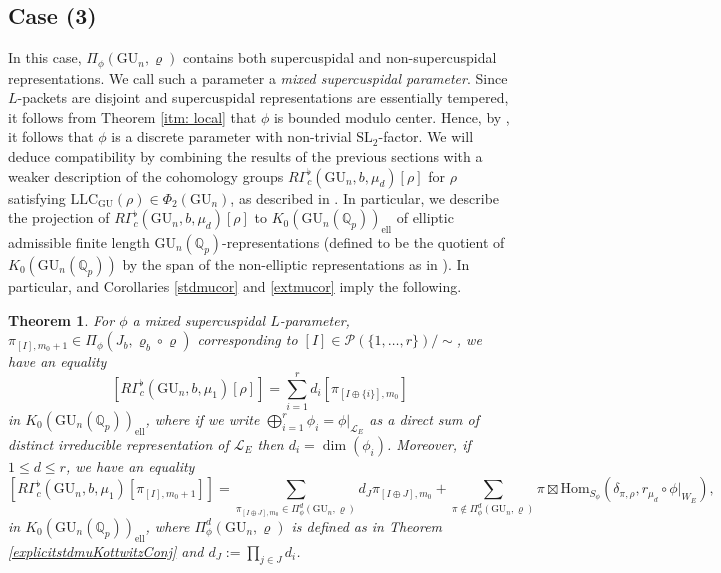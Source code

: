 \documentclass[reqno,11pt]{amsart}
\newtheorem{theorem}{Theorem}[section]
\theoremstyle{remark}
\newcommand{\GU}{\mathrm{GU}}
\newcommand{\mc}{\mathcal}
\newcommand{\Q}{\mathbb{Q}}
\newcommand{\SL}{\mathrm{SL}}
\newcommand{\LLC}{\mathrm{LLC}}
\begin{document}
\subsection{Case (3)} In this case, $\Pi_{\phi}(\GU_n, \varrho)$ contains both supercuspidal and non-supercuspidal representations. We call such a parameter a \emph{mixed supercuspidal parameter}. Since $L$-packets are disjoint and supercuspidal representations are essentially tempered, it follows from Theorem \ref{itm: local} that $\phi$ is bounded modulo center. Hence, by \cite[\S8.4.4]{Moe}, it follows that $\phi$ is a discrete parameter with non-trivial $\SL_2$-factor. 
We will deduce compatibility by combining the results of the previous sections with a weaker description of the cohomology groups $R\Gamma^{\flat}_{c}(\GU_n,b,\mu_{d})[\rho]$ for $\rho$ satisfying  $\LLC_{\GU}(\rho) \in \Phi_2(\GU_n)$, as described in \cite{HKW}. In particular, we describe the projection of $R\Gamma^{\flat}_{c}(\GU_n,b,\mu_{d})[\rho]$ to  $K_{0}(\GU_n(\mathbb{Q}_{p}))_{\mathrm{ell}}$ of elliptic admissible finite length $\GU_n(\mathbb{Q}_{p})$-representations (defined to be the quotient of $K_0(\GU_n(\Q_p))$ by the span of the non-elliptic representations as in \cite[Appendix C]{HKW}). In particular, \cite[Theorem~1.0.2]{HKW} and Corollaries \ref{stdmucor} and \ref{extmucor} imply the following.
\begin{theorem}{\label{appliedHKW}}
For $\phi$ a mixed supercuspidal $L$-parameter, $\pi_{[I], m_0+1} \in \Pi_{\phi}(J_{b}, \varrho_b \circ \varrho)$ corresponding to $[I] \in \mc{P}(\{1, \dots, r\})/ \sim$, we have an equality 
\[ [R\Gamma^{\flat}_{c}(\GU_n,b,\mu_{1})[\rho]] = \sum^r_{i=1} d_{i}[\pi_{[I \oplus \{i\}],m_0}]  \]
in $K_{0}(\GU_n(\mathbb{Q}_{p}))_{\mathrm{ell}}$, where if we write $\bigoplus_{i = 1}^{r} \phi_{i} = \phi|_{\mathcal{L}_{E}}$ as a direct sum of distinct irreducible representation of $\mathcal{L}_{E}$ then $d_{i} = \dim(\phi_{i})$. Moreover, if $1 \leq d \leq r$, we have an equality 
\[ [R\Gamma^{\flat}_{c}(\GU_n,b,\mu_{1})[\pi_{[I],m_0+1}]] = \sum_{\pi_{[I \oplus J],m_0} \in \Pi^{d}_{\phi}(\GU_{n},\varrho)} d_{J}\pi_{[I \oplus J],m_0}  +  \sum_{\pi \notin \Pi^{d}_{\phi}(\GU_{n},\varrho)} \pi \boxtimes \mathrm{Hom}_{S_{\phi}}(\delta_{\pi,\rho},r_{\mu_{d}}\circ \phi|_{W_{E}}), \]
in $K_{0}(\GU_n(\mathbb{Q}_{p}))_{\mathrm{ell}}$, where $\Pi^{d}_{\phi}(\GU_{n},\varrho)$ is defined as in Theorem \ref{explicitstdmuKottwitzConj} and $d_{J} := \prod_{j \in J} d_{i}$. 
\end{theorem}
\end{document}
